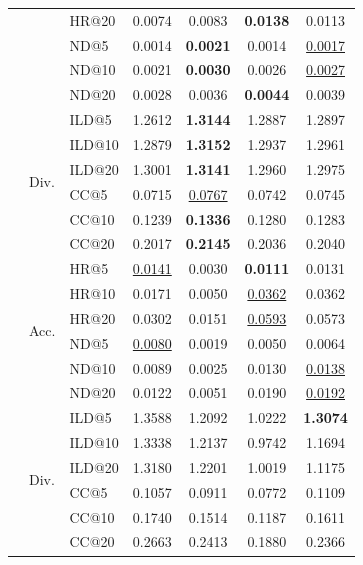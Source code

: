 \begin{table}[t]
\begin{tabular}{lllcccc}
 & & HR@20 & 0.0074 & 0.0083 & \textbf{0.0138} & 0.0113 \\
 & & ND@5  & 0.0014 & \textbf{0.0021} & 0.0014 & \underline{0.0017} \\
 & & ND@10 & 0.0021 & \textbf{0.0030} & 0.0026 & \underline{0.0027} \\
 & & ND@20 & 0.0028 & 0.0036 & \textbf{0.0044} & 0.0039 \\
 & \multirow{6}{*}{Div.}
 & ILD@5  & 1.2612 & \textbf{1.3144} & 1.2887 & 1.2897 \\
 & & ILD@10 & 1.2879 & \textbf{1.3152} & 1.2937 & 1.2961 \\
 & & ILD@20 & 1.3001 & \textbf{1.3141} & 1.2960 & 1.2975 \\
 & & CC@5   & 0.0715 & \underline{0.0767} & 0.0742 & 0.0745 \\
 & & CC@10  & 0.1239 & \textbf{0.1336} & 0.1280 & 0.1283 \\
 & & CC@20  & 0.2017 & \textbf{0.2145} & 0.2036 & 0.2040 \\
\addlinespace[0.4em]
\multirow{12}{*}{KuaiRand1K}
 & \multirow{6}{*}{Acc.}
 & HR@5  & \underline{0.0141} & 0.0030 & \textbf{0.0111} & 0.0131 \\
 & & HR@10 & 0.0171 & 0.0050 & \underline{0.0362} & 0.0362 \\
 & & HR@20 & 0.0302 & 0.0151 & \underline{0.0593} & 0.0573 \\
 & & ND@5  & \underline{0.0080} & 0.0019 & 0.0050 & 0.0064 \\
 & & ND@10 & 0.0089 & 0.0025 & 0.0130 & \underline{0.0138} \\
 & & ND@20 & 0.0122 & 0.0051 & 0.0190 & \underline{0.0192} \\
 & \multirow{6}{*}{Div.}
 & ILD@5  & 1.3588 & 1.2092 & 1.0222 & \textbf{1.3074} \\
 & & ILD@10 & 1.3338 & 1.2137 & 0.9742 & 1.1694 \\
 & & ILD@20 & 1.3180 & 1.2201 & 1.0019 & 1.1175 \\
 & & CC@5   & 0.1057 & 0.0911 & 0.0772 & 0.1109 \\
 & & CC@10  & 0.1740 & 0.1514 & 0.1187 & 0.1611 \\
 & & CC@20  & 0.2663 & 0.2413 & 0.1880 & 0.2366 \\
\bottomrule
\end{tabular}
\end{table}
